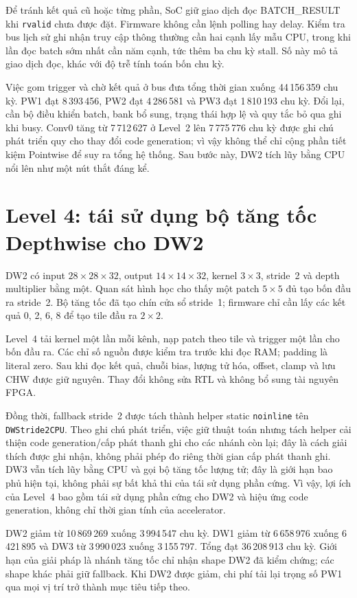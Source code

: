 Để tránh kết quả cũ hoặc từng phần, SoC giữ giao dịch đọc BATCH\_RESULT khi \texttt{rvalid} chưa được đặt. Firmware không cần lệnh polling hay delay. Kiểm tra bus lịch sử ghi nhận truy cập thông thường cần hai cạnh lấy mẫu CPU, trong khi lần đọc batch sớm nhất cần năm cạnh, tức thêm ba chu kỳ stall. Số này mô tả giao dịch đọc, khác với độ trễ tính toán bốn chu kỳ.

Việc gom trigger và chờ kết quả ở bus đưa tổng thời gian xuống 44\,156\,359 chu kỳ. PW1 đạt 8\,393\,456, PW2 đạt 4\,286\,581 và PW3 đạt 1\,810\,193 chu kỳ. Đổi lại, cần bộ điều khiển batch, bank bổ sung, trạng thái hợp lệ và quy tắc bỏ qua ghi khi busy. Conv0 tăng từ 7\,712\,627 ở Level~2 lên 7\,775\,776 chu kỳ được ghi chú phát triển quy cho thay đổi code generation; vì vậy không thể chỉ cộng phần tiết kiệm Pointwise để suy ra tổng hệ thống. Sau bước này, DW2 tích lũy bằng CPU nổi lên như một nút thắt đáng kể.

\section{Level 4: tái sử dụng bộ tăng tốc Depthwise cho DW2}
DW2 có input $28\times28\times32$, output $14\times14\times32$, kernel $3\times3$, stride~2 và depth multiplier bằng một. Quan sát hình học cho thấy một patch $5\times5$ đủ tạo bốn đầu ra stride~2. Bộ tăng tốc đã tạo chín cửa sổ stride~1; firmware chỉ cần lấy các kết quả 0, 2, 6, 8 để tạo tile đầu ra $2\times2$.

Level~4 tải kernel một lần mỗi kênh, nạp patch theo tile và trigger một lần cho bốn đầu ra. Các chỉ số nguồn được kiểm tra trước khi đọc RAM; padding là literal zero. Sau khi đọc kết quả, chuỗi bias, lượng tử hóa, offset, clamp và lưu CHW được giữ nguyên. Thay đổi không sửa RTL và không bổ sung tài nguyên FPGA.

Đồng thời, fallback stride~2 được tách thành helper static \texttt{noinline} tên \texttt{DWStride2CPU}. Theo ghi chú phát triển, việc giữ thuật toán nhưng tách helper cải thiện code generation/cấp phát thanh ghi cho các nhánh còn lại; đây là cách giải thích được ghi nhận, không phải phép đo riêng thời gian cấp phát thanh ghi. DW3 vẫn tích lũy bằng CPU và gọi bộ tăng tốc lượng tử; đây là giới hạn bao phủ hiện tại, không phải sự bất khả thi của tái sử dụng phần cứng. Vì vậy, lợi ích của Level~4 bao gồm tái sử dụng phần cứng cho DW2 và hiệu ứng code generation, không chỉ thời gian tính của accelerator.

DW2 giảm từ 10\,869\,269 xuống 3\,994\,547 chu kỳ. DW1 giảm từ 6\,658\,976 xuống 6\,421\,895 và DW3 từ 3\,990\,023 xuống 3\,155\,797. Tổng đạt 36\,208\,913 chu kỳ. Giới hạn của giải pháp là nhánh tăng tốc chỉ nhận shape DW2 đã kiểm chứng; các shape khác phải giữ fallback. Khi DW2 được giảm, chi phí tải lại trọng số PW1 qua mọi vị trí trở thành mục tiêu tiếp theo.

